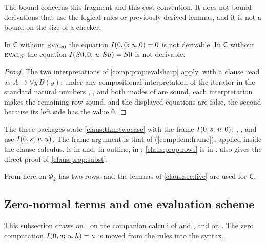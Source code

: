 The bound concerns this fragment and this cost convention. It does not
bound derivations that use the logical rules or previously derived lemmas,
and it is not a bound on the size of a checker.

\begin{proposition}
\label{claus:prop:rows}
In $\mathsf{C}$ without $\rulename{Eval}_0$ the equation
$I(0,0;\,u.\,0)=0$ is not derivable. In $\mathsf{C}$ without
$\rulename{Eval}_{\Suc}$ the equation
$I(S 0,0;\,u.\,S u)=S 0$ is not derivable.
\end{proposition}
\begin{proof}
The two interpretations of \cref{comp:prop:evalsharp} apply, with a clause
read as $A\to\forall y\,B(y)$: under any compositional interpretation of
the iterator in the standard natural numbers ,
,  and both modes of  are
sound, each interpretation makes the remaining row sound, and the displayed
equations are false, the second because its left side has the value $0$.
\end{proof}

\begin{remark}
\label{claus:rem:twopkgs}
The three packages state \cref{claus:thm:twocase} with the
frame $I(0,s;\,u.\,0)$; , ,
 and  use $I(0,s;\,u.\,u)$. The frame
argument is that of 
(\cref{comp:lem:frame}), applied inside the
clause calculus.  is in
 and, in outline, in
; \cref{claus:prop:rows} is in
.  also gives the direct
proof of \cref{claus:prop:subst}.
\end{remark}

From here on $\Phi_2$ has two rows, and the lemmas of \cref{claus:sec:five}
are used for $\mathsf{C}$.

\subsection{Zero-normal terms and one evaluation scheme}
\label{claus:sec:zero}

This subsection draws on , on the
companion calculi of  and
, and on . The zero computation
$I(0,a;\,u.\,h)=a$ is moved from the rules into the syntax.

